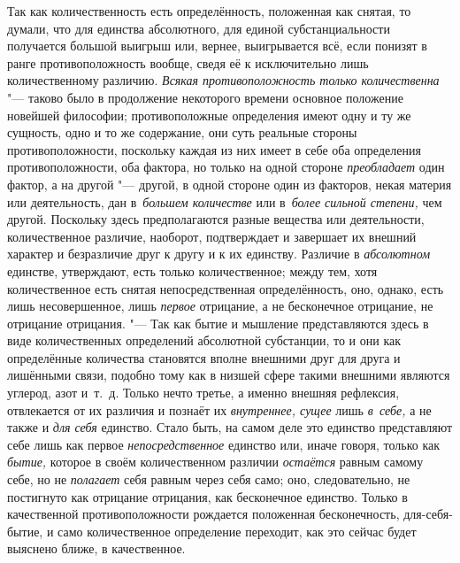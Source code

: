 \label{bkm:bm69a}Так как количественность есть определённость, положенная как
снятая, то думали, что для единства абсолютного, для единой субстанциальности
получается большой выигрыш или, вернее, выигрывается всё, если понизят в ранге
противоположность вообще, сведя её к исключительно лишь количественному
различию. {\em Всякая противоположность только количественна} "--- таково было
в продолжение некоторого времени основное положение новейшей
философии; противоположные определения
имеют одну и ту же сущность, одно и то же содержание, они суть реальные стороны
противоположности, поскольку каждая из них имеет в себе оба определения
противоположности, оба фактора, но только на одной стороне {\em преобладает}
один фактор, а на другой "--- другой, в одной стороне один из факторов, некая
материя или деятельность, дан в~{\em большем количестве} или
в~{\em более сильной степени,} чем другой. Поскольку здесь предполагаются
разные вещества или деятельности, количественное различие, наоборот,
подтверждает и завершает их внешний характер и безразличие друг к другу и к их
единству. Различие в {\em абсолютном} единстве, утверждают, есть только
количественное; между тем, хотя количественное есть снятая непосредственная
определённость, оно, однако, есть лишь несовершенное, лишь {\em первое}
отрицание, а не бесконечное отрицание, не отрицание отрицания. "--- Так как
бытие и мышление представляются здесь в виде количественных определений
абсолютной субстанции, то и они как определённые количества становятся вполне
внешними друг для друга и лишёнными связи, подобно тому как в низшей сфере
такими внешними являются углерод, азот и~т.~д. Только нечто третье, а именно
внешняя рефлексия, отвлекается от их различия и познаёт их
{\em внутреннее, сущее} лишь {\em в~себе,} а не также и {\em для себя}
единство. Стало быть, на самом деле это единство представляют себе лишь как
первое {\em непосредственное} единство или, иначе говоря, только как
{\em бытие,} которое в своём количественном различии {\em остаётся} равным
самому себе, но не {\em полагает} себя равным через себя само; оно,
следовательно, не постигнуто как отрицание отрицания, как бесконечное единство.
Только в качественной противоположности рождается положенная бесконечность,
для-себя-бытие, и само количественное определение переходит, как это сейчас
будет выяснено ближе, в качественное.


